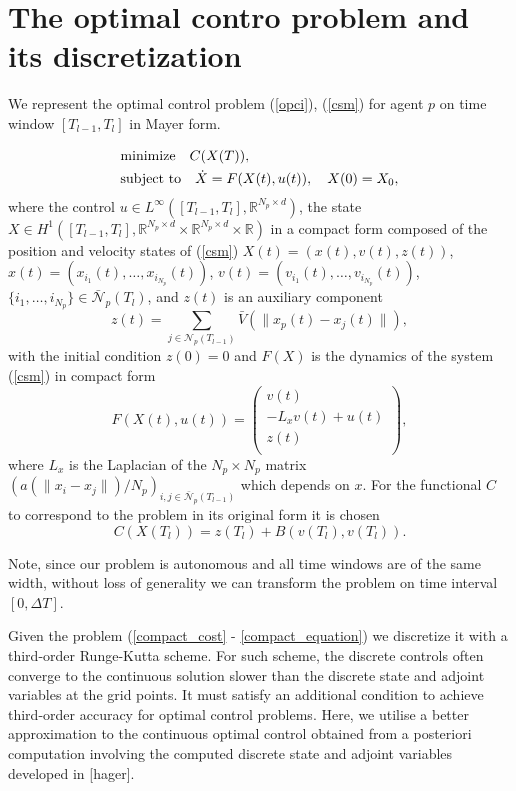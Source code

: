 \documentclass[a4paper,10pt, english]{article}
\newcommand{\D}{\displaystyle}
\begin{document}
 
 
 \section{The optimal contro problem and its discretization}
  We represent the optimal control problem  (\ref{opci}), (\ref{csm}) for agent $p$ on time window $[T_{l-1}, T_{l}]$ in Mayer form.
  
 \begin{align}
 \D
 & \mbox{minimize}\quad  C(X(T)),   \label{compact_cost} \\ 
 & \mbox{subject to} \quad \dot{X} = F(X(t), u(t)), \quad X(0) = X_0, \label{compact_equation}
 \end{align}
where  the control $u \in  L^{\infty}([T_{l-1}, T_{l}], \mathbb{R}^{N_p \times d})$,
the state $X\in H^1([T_{l-1}, T_{l}], \mathbb{R}^{N_p \times d} \times \mathbb{R}^{N_p\times d} \times \mathbb{R})$
in a compact form composed of the position and velocity 
states of (\ref{csm})   $X(t) = (x(t), v(t), z(t))$, $x(t) = (x_{i_1}(t), \dots, x_{i_{N_p}}(t))$,
 $v(t) = (v_{i_1}(t), \dots, v_{i_{N_p}}(t))$, $\{i_1, \dots, i_{N_p}\} \in \bar{\mathcal{N}}_p(T_l)$, 
 and $z(t)$ is an auxiliary component 
 $$
 z(t) =  \sum_{j\in \mathcal{N}_p(T_{l-1})} \bar{V}(\|x_p(t) - x_j(t)\|),
 $$
 with the initial condition $z(0) = 0$ and $F(X)$ is the dynamics of the system (\ref{csm}) in compact form
 $$
 F(X(t), u(t)) =
  \left( 
  \begin{array}{c}
  v(t)\\
   - L_xv(t) + u(t)\\
   z(t)\\
 \end{array} 
 \right), 
 $$
 where $L_x$ is the Laplacian of the $N_p\times N_p$ matrix $(a(\|x_i - x_j\|)/N_p)_{i, j\in\bar{\mathcal{N}}_p(T_{l-1})}$ which depends on $x$.
 For the functional $C$ to correspond to the problem in its original form it is chosen 
 $$
 C(X(T_l)) = z(T_l) + B(v(T_l), v(T_l)).
 $$
 
  Note, since our problem is autonomous and all time windows are of the same width, without loss of generality
 we can transform the problem on time interval $[0, \Delta T]$. 
 
 
  
  Given the problem (\ref{compact_cost} - \ref{compact_equation}) we discretize it with a third-order Runge-Kutta scheme.  For such scheme, the discrete controls often converge to the continuous solution slower than the discrete state and adjoint variables at the grid points. It  must satisfy an additional condition to achieve third-order accuracy
    for optimal control problems. Here, we utilise a better approximation to the continuous optimal control obtained from a posteriori computation involving the computed discrete state and adjoint variables  developed in [hager]. 
    
\end{document}
